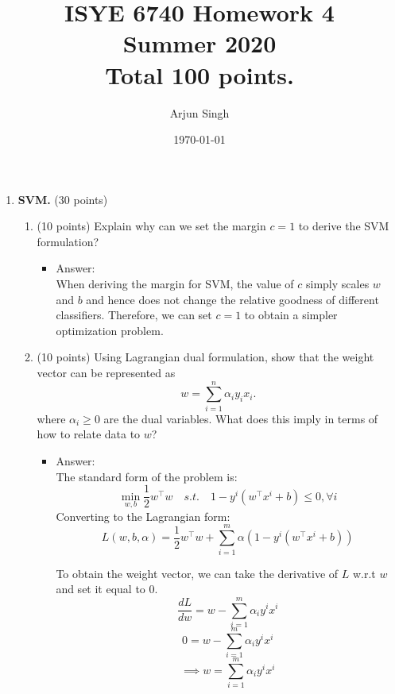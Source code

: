 \documentclass[twoside,10pt]{article}
\begin{document}
\title{ISYE 6740 Homework 4\\ 
Summer 2020\\
\small Total 100 points.}
\author{Arjun Singh}
\date{\today}
\maketitle







\begin{enumerate}


\item{\bf SVM. } (30 points)

\begin{enumerate}
\item (10 points) Explain why can we set the margin $c = 1$ to derive the SVM formulation?
\begin{itemize}
\item Answer:\\
When deriving the margin for SVM, the value of $c$ simply scales $w$ and $b$ and hence does not change the relative goodness of different classifiers. Therefore, we can set $c = 1$ to obtain a simpler optimization problem.
\end{itemize}
\item (10 points) Using Lagrangian dual formulation, show that the weight vector can be represented as
\[
w = \sum_{i=1}^n \alpha_i y_i x_i.
\]
where $\alpha_i \geq 0$ are the dual variables. What does this imply in terms of how to relate data to $w$?
\begin{itemize}
\item Answer:\\
The standard form of the problem is:
$$\min\limits_{w,b} \frac{1}{2} w^\intercal w \quad s.t. \quad 1 - y^i(w^\intercal x^i + b) \leq 0, \forall i$$
Converting to the Lagrangian form:
$$ L(w,b,\alpha) = \frac{1}{2} w^\intercal w + \sum_{i=1}^m \alpha(1 - y^i(w^\intercal x^i + b))
$$

To obtain the weight vector, we can take the derivative of $L$ w.r.t $w$ and set it equal to 0.
$$ \frac{dL}{dw} = w - \sum_{i=1}^m \alpha_i y^i x^i $$
$$ 0 = w - \sum_{i=1}^m \alpha_i y^i x^i $$
$$\implies w =  \sum_{i=1}^m \alpha_i y^i x^i$$


\end{itemize}
\end{enumerate}
\end{enumerate}
\end{document}
